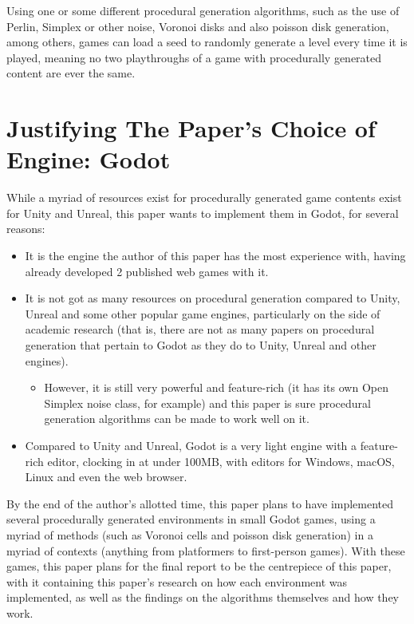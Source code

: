 Using one or some different procedural generation algorithms, such as the use of Perlin, Simplex or other noise, Voronoi disks and also poisson disk generation, among others, games can load a seed to randomly generate a level every time it is played, meaning no two playthroughs of a game with procedurally generated content are ever the same.

\section{Justifying The Paper's Choice of Engine: Godot}

While a myriad of resources exist for procedurally generated game contents exist for Unity and Unreal, this paper wants to implement them in Godot, for several reasons:

\begin{itemize}
	\item It is the engine the author of this paper has the most experience with, having already developed 2 published web games with it.
	\item It is not got as many resources on procedural generation compared to Unity, Unreal and some other popular game engines, particularly on the side of academic research (that is, there are not as many papers on procedural generation that pertain to Godot as they do to Unity, Unreal and other engines).
	\begin{itemize}
		\item However, it is still very powerful and feature-rich (it has its own Open Simplex noise class, for example) and this paper is sure procedural generation algorithms can be made to work well on it.
	\end{itemize}
	\item Compared to Unity and Unreal, Godot is a very light engine with a feature-rich editor, clocking in at under 100MB, with editors for Windows, macOS, Linux and even the web browser. 
\end{itemize}

By the end of the author's allotted time, this paper plans to have implemented several procedurally generated environments in small Godot games, using a myriad of methods (such as Voronoi cells and poisson disk generation) in a myriad of contexts (anything from platformers to first-person games). With these games, this paper plans for the final report to be the centrepiece of this paper, with it containing this paper's research on how each environment was implemented, as well as the findings on the algorithms themselves and how they work.

